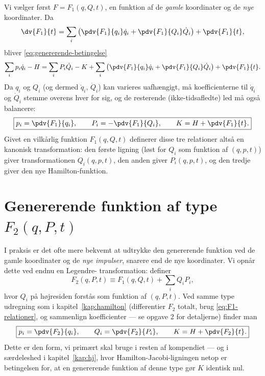 Vi vælger først $F=F_1(q,Q,t)$, en funktion af de \emph{gamle}
koordinater og de \emph{nye} koordinater. Da
\begin{equation}
  \dv{F_1}{t} = \sum_i\left(\pdv{F_1}{q_i}\dot q_i + \pdv{F_1}{Q_i}\dot Q_i\right) + \pdv{F_1}{t},
\end{equation}
bliver \eqref{eq:genererende-betingelse}
\begin{equation}
  \sum_i p_i\dot q_i - H = \sum_i P_i\dot Q_i - K
  + \sum_i\left(\pdv{F_1}{q_i}\dot q_i + \pdv{F_1}{Q_i}\dot Q_i\right) + \pdv{F_1}{t}.
\end{equation}
Da $q_i$ og $Q_i$ (og dermed $\dot q_i$, $\dot Q_i$) kan varieres
uafhængigt, må koefficienterne til $\dot q_i$ og $\dot Q_i$ stemme
overens hver for sig, og de resterende (ikke-tidsafledte) led må også
balancere:
\begin{equation}
  \boxed{p_i = \pdv{F_1}{q_i}, \qquad P_i = -\pdv{F_1}{Q_i}, \qquad K = H + \pdv{F_1}{t}.}
  \label{eq:F1-relationer}
\end{equation}
Givet en vilkårlig funktion $F_1(q,Q,t)$ definerer disse tre
relationer altså en kanonisk transformation: den første ligning
(løst for $Q_i$ som funktion af $(q,p,t)$) giver transformationen
$Q_i(q,p,t)$, den anden giver $P_i(q,p,t)$, og den tredje giver den nye
Hamilton-funktion.

\section{Genererende funktion af type $F_2(q,P,t)$}

I praksis er det ofte mere bekvemt at udtrykke den genererende
funktion ved de gamle koordinater og de \emph{nye impulser}, snarere
end de nye koordinater. Vi opnår dette ved endnu en Legendre-
transformation: definer
\begin{equation}
  F_2(q,P,t) \equiv F_1(q,Q,t) + \sum_i Q_i P_i,
\end{equation}
hvor $Q_i$ på højresiden forstås som funktion af $(q,P,t)$. Ved samme
type udregning som i kapitel~\ref{kap:hamilton} (differentier $F_2$
totalt, brug \eqref{eq:F1-relationer}, og sammenlign koefficienter —
se opgave 2 for detaljerne) finder man
\begin{equation}
  \boxed{p_i = \pdv{F_2}{q_i}, \qquad Q_i = \pdv{F_2}{P_i}, \qquad K = H + \pdv{F_2}{t}.}
  \label{eq:F2-relationer}
\end{equation}
Dette er den form, vi primært skal bruge i resten af kompendiet — og
i særdeleshed i kapitel~\ref{kap:hj}, hvor Hamilton-Jacobi-ligningen
netop er betingelsen for, at en genererende funktion af denne type
gør $K$ identisk nul.

